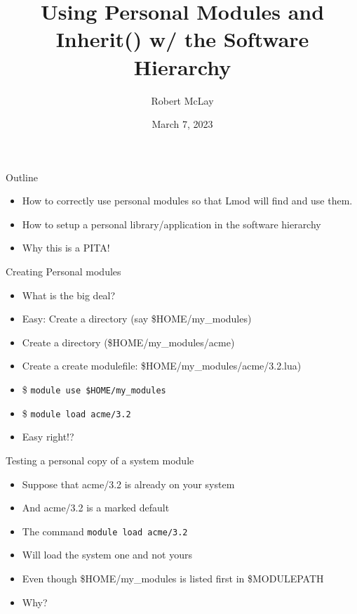\documentclass{beamer}
\begin{document}
\title[Lmod]{Using Personal Modules and Inherit() w/ the Software Hierarchy}
\author{Robert McLay} 
\date{March 7, 2023}

\frame{\titlepage} 


\begin{frame}{Outline}
  \begin{itemize}
    \item How to correctly use personal modules so that Lmod will find
      and use them.
    \item How to setup a personal library/application in the software
      hierarchy
    \item Why this is a PITA!
  \end{itemize}
\end{frame}

\begin{frame}{Creating Personal modules}
  \begin{itemize}
    \item What is the big deal?
    \item Easy: Create a directory (say \$HOME/my\_modules)
    \item Create a directory (\$HOME/my\_modules/acme)
    \item Create a create modulefile: \$HOME/my\_modules/acme/3.2.lua)
    \item \$ \texttt{module use \$HOME/my\_modules}
    \item \$ \texttt{module load acme/3.2}
    \item Easy right!?
  \end{itemize}
\end{frame}

\begin{frame}{Testing a personal copy of a system module}
  \begin{itemize}
    \item Suppose that acme/3.2 is already on your system
    \item And acme/3.2 is a marked default
    \item The command \texttt{module load acme/3.2}
    \item Will load the system one and not yours
    \item Even though \$HOME/my\_modules is listed first in \$MODULEPATH
    \item Why?
  \end{itemize}
\end{frame}
\end{document}
